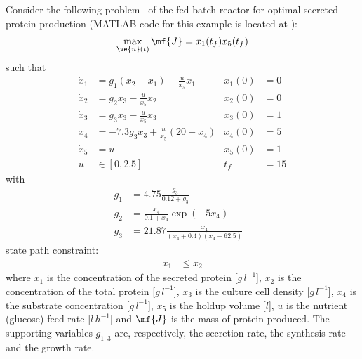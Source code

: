 Consider the following problem~\citep{PR_bior} of the fed-batch
reactor for optimal secreted protein production (MATLAB code for this
example is located at ):
\begin{gather}
\max_{\ve{u}(t)} \mf{J} = x_{1}(t_f)x_{5}(t_f) \label{eq:bior}
\end{gather}
such that
\begin{align}
\dot{x}_1  & = g_{1}(x_{2}-x_{1})-\frac{u}{x_{5}}x_{1} & x_{1}(0) & = 0\\
\dot{x}_2  & = g_{2}x_{3}-\frac{u}{x_{5}}x_{2} & x_{2}(0) & = 0\\
\dot{x}_3  & = g_{3}x_{3}-\frac{u}{x_{5}}x_{3} & x_{3}(0) & = 1 \\
\dot{x}_4  & = -7.3g_{3}x_{3}+\frac{u}{x_{5}}(20-x_4) & x_{4}(0) & = 5 \\
\dot{x}_5  & = u & x_{5}(0) & = 1 \\
u  & \in [0,2.5] & t_f & = 15
\end{align}
with
\begin{align}
g_{1}  & =  4.75\frac{g_{3}}{0.12+g_{3}} &\\
g_{2}  & = \frac{x_{4}}{0.1+x_{4}}\exp(-5x_{4}) &\\
g_{3}  & = 21.87\frac{x_{4}}{(x_{4}+0.4)(x_{4}+62.5)} &
\end{align}
state path constraint:
\begin{align}
x_{1} & \leq x_{2}
\end{align}
where $x_{1}$ is the concentration of the secreted protein
[$\unit{g\,l^{-1}}$], $x_{2}$ is the concentration of the total protein
[$\unit{g\,l^{-1}}$], $x_{3}$ is the culture cell density
[$\unit{g\,l^{-1}}$], $x_{4}$ is the substrate concentration
[$\unit{g\,l^{-1}}$], $x_{5}$ is the holdup volume [$\unit{l}$], $u$
is the nutrient (glucose) feed rate [$\unit{l\,h^{-1}}$] and $\mf{J}$
is the mass of protein produced. The supporting variables
$g_{1\text{--}3}$ are, respectively, the secretion rate, the synthesis
rate and the growth rate.

